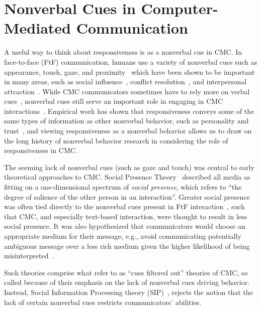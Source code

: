 \documentclass[12pt]{nuthesis}	%
\begin{document}
\section{Nonverbal Cues in Computer-Mediated Communication}

A useful way to think about responsiveness is as a nonverbal cue in CMC. In face-to-face (FtF) communication, humans use a variety of nonverbal cues such as appearance, touch, gaze, and proximity~\citep{burgoon2016nonverbal} which have been shown to be important in many areas, such as social influence~\citep{hogg2006social}, conflict resolution~\citep{ting2001managing}, and interpersonal attraction~\citep{burgoon1991relational,erceau2007tactile}. While CMC communicators sometimes have to rely more on verbal cues~\citep{walther2005let}, nonverbal cues still serve an important role in engaging in CMC interactions~\citep{lo2008nonverbal,tidwell2002computer,walther1992interpersonal}. Empirical work has shown that responsiveness conveys some of the same types of information as other nonverbal behavior, such as personality and trust~\citep{kalman2013online}, and viewing responsiveness as a nonverbal behavior allows us to draw on the long history of nonverbal behavior research in considering the role of responsiveness in CMC.

The seeming lack of nonverbal cues (such as gaze and touch) was central to early theoretical approaches to CMC. Social Presence Theory~\citep{short1976social} described all media as fitting on a one-dimensional spectrum of \textit{social presence}, which refers to ``the degree of salience of the other person in an interaction''. Greater social presence was often tied directly to the nonverbal cues present in FtF interaction~\citep[e.g.,][]{burgoon1984relational}, such that CMC, and especially text-based interaction, were thought to result in less social presence. It was also hypothesized that communicators would choose an appropriate medium for their message, e.g., avoid communicating potentially ambiguous message over a less rich medium given the higher likelihood of being misinterpreted~\citep{daft1986organizational}.

Such theories comprise what \citet{walther2002cues} refer to as ``cues filtered out'' theories of CMC, so called because of their emphasis on the lack of nonverbal cues driving behavior. Instead, Social Information Processing theory (SIP)~\citep{walther1992interpersonal}, rejects the notion that the lack of certain nonverbal cues restricts communicators' abilities. 
\end{document}
